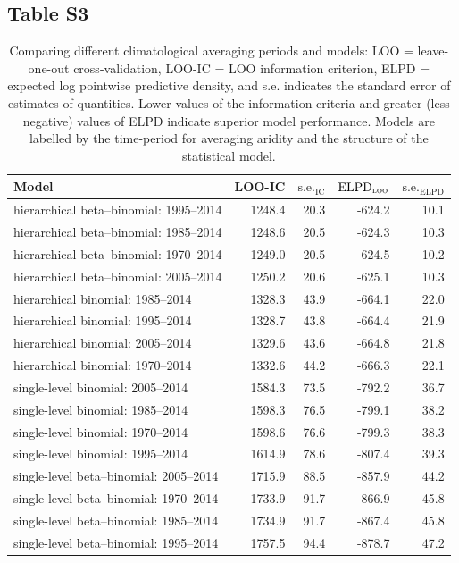 \documentclass[draft]{agujournal}\usepackage{knitr}
\begin{document}
\subsection*{Table S3}
\begin{table}[H]
\centering
\begingroup\small
\begin{tabular}{p{3in}rrrr}
  \hline
Model & LOO-IC & $\text{s.e.}_{\text{IC}}$ & $\text{ELPD}_{\text{\scshape{loo}}}$ & $\text{s.e.}_{\text{ELPD}}$ \\ 
  \hline
hierarchical beta--binomial: 1995--2014 & 1248.4 & 20.3 & -624.2 & 10.1 \\ 
  hierarchical beta--binomial: 1985--2014 & 1248.6 & 20.5 & -624.3 & 10.3 \\ 
  hierarchical beta--binomial: 1970--2014 & 1249.0 & 20.5 & -624.5 & 10.2 \\ 
  hierarchical beta--binomial: 2005--2014 & 1250.2 & 20.6 & -625.1 & 10.3 \\ 
  hierarchical binomial: 1985--2014 & 1328.3 & 43.9 & -664.1 & 22.0 \\ 
  hierarchical binomial: 1995--2014 & 1328.7 & 43.8 & -664.4 & 21.9 \\ 
  hierarchical binomial: 2005--2014 & 1329.6 & 43.6 & -664.8 & 21.8 \\ 
  hierarchical binomial: 1970--2014 & 1332.6 & 44.2 & -666.3 & 22.1 \\ 
  single-level binomial: 2005--2014 & 1584.3 & 73.5 & -792.2 & 36.7 \\ 
  single-level binomial: 1985--2014 & 1598.3 & 76.5 & -799.1 & 38.2 \\ 
  single-level binomial: 1970--2014 & 1598.6 & 76.6 & -799.3 & 38.3 \\ 
  single-level binomial: 1995--2014 & 1614.9 & 78.6 & -807.4 & 39.3 \\ 
  single-level beta--binomial: 2005--2014 & 1715.9 & 88.5 & -857.9 & 44.2 \\ 
  single-level beta--binomial: 1970--2014 & 1733.9 & 91.7 & -866.9 & 45.8 \\ 
  single-level beta--binomial: 1985--2014 & 1734.9 & 91.7 & -867.4 & 45.8 \\ 
  single-level beta--binomial: 1995--2014 & 1757.5 & 94.4 & -878.7 & 47.2 \\ 
   \hline
\end{tabular}
\endgroup
\caption[Model comparison: LOO (climatological interval).]{Comparing different climatological averaging periods and models: LOO = leave-one-out cross-validation, LOO-IC = LOO information criterion, ELPD = expected log pointwise predictive density, and s.e. indicates the standard error of estimates of quantities. Lower values of the information criteria and greater (less negative) values of ELPD indicate superior model performance. Models are labelled by the time-period for averaging aridity and the structure of the statistical model.} 
\label{tab:loo.years}
\end{table}
\end{document}

